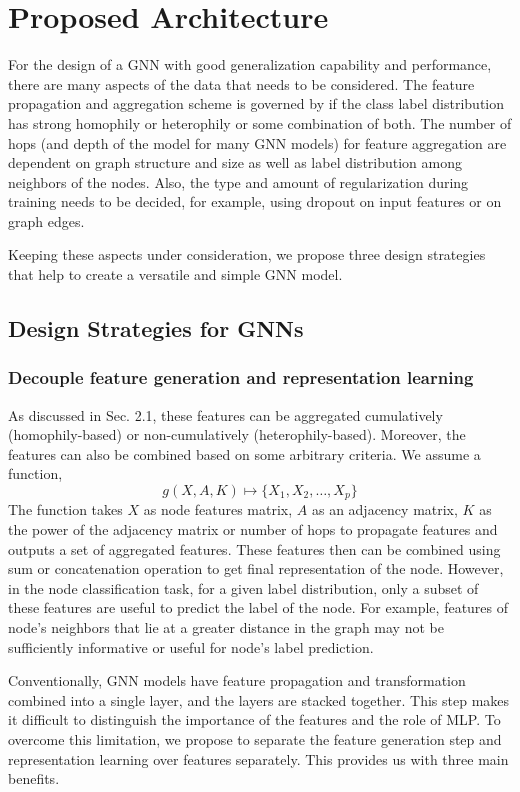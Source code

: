 \documentclass[sigconf,natbib=false]{acmart}
\begin{document}
\section{Proposed Architecture}
\label{propose_arch}
For the design of a GNN with good generalization capability and performance, there are many aspects of the data that needs to be considered. The feature propagation and aggregation scheme is governed by if the class label distribution has strong homophily or heterophily or some combination of both. The number of hops (and depth of the model for many GNN models) for feature aggregation are dependent on graph structure and size as well as label distribution among neighbors of the nodes. Also, the type and amount of regularization during training needs to be decided, for example, using dropout on input features or on graph edges.

Keeping these aspects under consideration, we propose three design strategies that help to create a versatile and simple GNN model.

\vspace{5mm}
\subsection{Design Strategies for GNNs}
\subsubsection{Decouple feature generation and representation learning}\hfill

As discussed in Sec. 2.1, these features can be aggregated cumulatively (homophily-based) or non-cumulatively (heterophily-based). Moreover, the features can also be combined based on some arbitrary criteria. We assume a function, 
$$g(X,A,K) \mapsto \{X_1,X_2, \dotsc ,X_p\}$$
The function takes $X$ as node features matrix, $A$ as an adjacency matrix, $K$ as the power of the adjacency matrix or number of hops to propagate features and outputs a set of aggregated features. These features then can be combined using sum or concatenation operation to get final representation of the node.  However, in the node classification task, for a given label distribution, only a subset of these features are useful to predict the label of the node. For example, features of node's neighbors that lie at a greater distance in the graph may not be sufficiently informative or useful for node's label prediction.

Conventionally, GNN models have feature propagation and transformation combined into a single layer, and the layers are stacked together. This step makes it difficult to distinguish the importance of the features and the role of MLP. To overcome this limitation, we propose to separate the feature generation step and representation learning over features separately. This provides us with three main benefits. 
\end{document}
